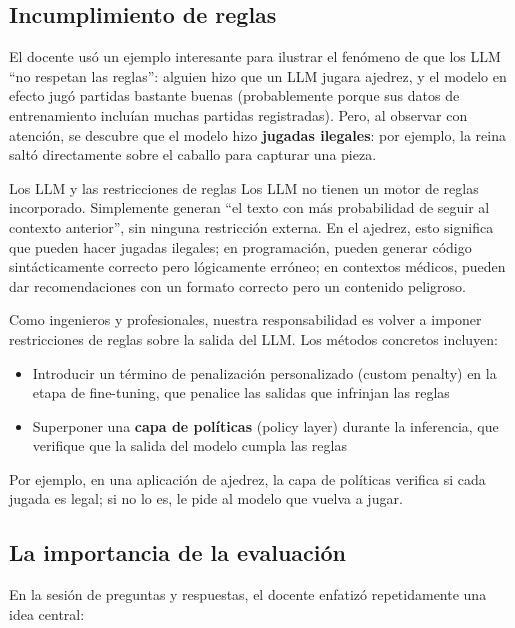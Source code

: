 \subsection{Incumplimiento de reglas}

El docente usó un ejemplo interesante para ilustrar el fenómeno de que los LLM ``no respetan las reglas'': alguien hizo que un LLM jugara ajedrez, y el modelo en efecto jugó partidas bastante buenas (probablemente porque sus datos de entrenamiento incluían muchas partidas registradas). Pero, al observar con atención, se descubre que el modelo hizo \textbf{jugadas ilegales}: por ejemplo, la reina saltó directamente sobre el caballo para capturar una pieza.

\begin{knowledgebox}{Los LLM y las restricciones de reglas}
Los LLM no tienen un motor de reglas incorporado. Simplemente generan ``el texto con más probabilidad de seguir al contexto anterior'', sin ninguna restricción externa. En el ajedrez, esto significa que pueden hacer jugadas ilegales; en programación, pueden generar código sintácticamente correcto pero lógicamente erróneo; en contextos médicos, pueden dar recomendaciones con un formato correcto pero un contenido peligroso.

Como ingenieros y profesionales, nuestra responsabilidad es volver a imponer restricciones de reglas sobre la salida del LLM. Los métodos concretos incluyen:
\begin{itemize}
    \item Introducir un término de penalización personalizado (custom penalty) en la etapa de fine-tuning, que penalice las salidas que infrinjan las reglas
    \item Superponer una \textbf{capa de políticas} (policy layer) durante la inferencia, que verifique que la salida del modelo cumpla las reglas
\end{itemize}
Por ejemplo, en una aplicación de ajedrez, la capa de políticas verifica si cada jugada es legal; si no lo es, le pide al modelo que vuelva a jugar.
\end{knowledgebox}

\subsection{La importancia de la evaluación}

En la sesión de preguntas y respuestas, el docente enfatizó repetidamente una idea central:


